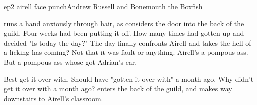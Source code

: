 \documentclass{book}
\begin{document}
\begin{childnode}{ep2 airell face punch}{Andrew Russell and Bonemouth the Boxfish}

    \name{} runs a hand anxiously through \hisher{} hair, as \heshe{} considers the door into the back of the guild. Four weeks \heshe{} had been putting it off. How many times had \heshe{} gotten
    up and decided "Is today the day?" The day \heshe{} finally confronts Airell and takes the hell 
    of a licking \heshe{} has coming? Not that it was \hisher{} fault or anything. Airell's a 
    pompous ass. But a pompous ass whose got Adrian's ear.

    Best get it over with. Should have "gotten it over with" a month ago. Why didn't \heshe{} get it over with a month ago? \name{} enters the back of the guild, and makes \hisher{} way downstairs
    to Airell's classroom. 



\end{childnode}
\end{document}
